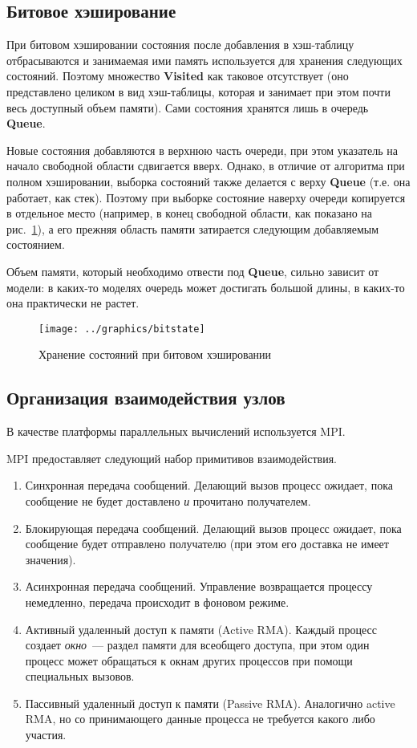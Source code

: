 \documentclass[12pt,a4paper,fleqn]{article}
\newcommand{\Code}[1]{\textbf{\mbox{#1}}}
\newcommand{\Term}[1]{\emph{\mbox{#1}}}
\begin{document}
\subsection{Битовое хэширование}
\label{sec:bithash-store}

При битовом хэшировании состояния после добавления в хэш-таблицу отбрасываются и занимаемая ими
память используется для хранения следующих состояний. Поэтому множество \Code{Visited} как таковое
отсутствует (оно представлено целиком в вид хэш-таблицы, которая и занимает при этом почти весь
доступный объем памяти). Сами состояния хранятся лишь в очередь \Code{Queue}.

Новые состояния добавляются в верхнюю часть очереди, при этом указатель на начало
свободной области сдвигается вверх. Однако, в отличие от алгоритма при полном хэшировании,
выборка состояний также делается с верху \Code{Queue} (т.е. она работает, как
стек). Поэтому при выборке состояние наверху очереди копируется в отдельное место
(например, в конец свободной области, как показано на рис.~\ref{fig:bitstate}), а его
прежняя область памяти затирается следующим добавляемым состоянием.

Объем памяти, который необходимо отвести под \Code{Queue}, сильно зависит от модели: в
каких-то моделях очередь может достигать большой длины, в каких-то она практически не
растет.

\begin{figure}[ht]
  \centering
  \texttt{[image: ../graphics/bitstate]}  
  \caption{Хранение состояний при битовом хэшировании}
  \label{fig:bitstate}
\end{figure}

\subsection{Организация взаимодействия узлов}

В качестве платформы параллельных вычислений используется MPI.

MPI предоставляет следующий набор примитивов взаимодействия.

\begin{enumerate}
\item Синхронная передача сообщений. Делающий вызов процесс ожидает, пока сообщение не
  будет доставлено \emph{и} прочитано получателем.
\item Блокирующая передача сообщений. Делающий вызов процесс ожидает, пока сообщение будет
  отправлено получателю (при этом его доставка не имеет значения).
\item Асинхронная передача сообщений. Управление возвращается процессу немедленно,
  передача происходит в фоновом режиме.
\item Активный удаленный доступ к памяти (Active RMA). Каждый процесс создает
  \Term{окно}~--- раздел памяти для всеобщего доступа, при этом один процесс может
  обращаться к окнам других процессов при помощи специальных вызовов.
\item Пассивный удаленный доступ к памяти (Passive RMA). Аналогично active RMA, но со
  принимающего данные процесса не требуется какого либо участия.
\end{enumerate}
\end{document}
